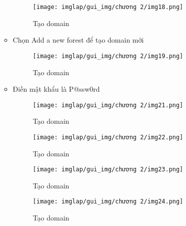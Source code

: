 \documentclass[13pt]{article}
\begin{document}
\begin{itemize}
\begin{itemize}
                            \begin{figure}[H]
                                \centering
                                \texttt{[image: imglap/gui\_img/chương 2/img18.png]}
                                \caption{Tạo domain}
                                \label{fig:enter-label}
                            \end{figure}
                            \newpage
                            \item Chọn Add a new forest để tạo domain mới
                            \begin{figure}[H]
                                \centering
                                \texttt{[image: imglap/gui\_img/chương 2/img19.png]}
                                \caption{Tạo domain}
                                \label{fig:enter-label}
                            \end{figure}

                            \item Điền mật khẩu là P@ssw0rd
                            \begin{figure}[H]
                                \centering
                                \texttt{[image: imglap/gui\_img/chương 2/img21.png]}
                                \caption{Tạo domain}
                                \label{fig:enter-label}
                            \end{figure}

                            \begin{figure}[H]
                                \centering
                                \texttt{[image: imglap/gui\_img/chương 2/img22.png]}
                                \caption{Tạo domain}
                                \label{fig:enter-label}
                            \end{figure}

                            \begin{figure}[H]
                                \centering
                                \texttt{[image: imglap/gui\_img/chương 2/img23.png]}
                                \caption{Tạo domain}
                                \label{fig:enter-label}
                            \end{figure}

                            \begin{figure}[H]
                                \centering
                                \texttt{[image: imglap/gui\_img/chương 2/img24.png]}
                                \caption{Tạo domain}
                                \label{fig:enter-label}
                            \end{figure}


\end{itemize}
\end{itemize}
\end{document}
